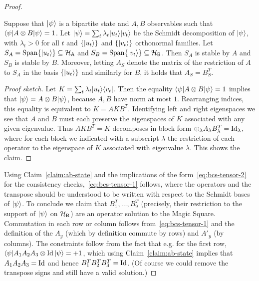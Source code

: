 \begin{proof}
\begin{claim}\label{claim:ab-state}
Suppose that $|\psi\rangle$ is a bipartite state and $A,B$ observables such that $\langle\psi| A\otimes B |\psi\rangle = 1$. Let $|\psi\rangle = \sum_t \lambda_t |u_t\rangle |v_t\rangle$ be the Schmidt decomposition of $|\psi\rangle$, with $\lambda_t>0$ for all $t$ and $\{|u_t\rangle\}$ and $\{|v_t\rangle\}$ orthonormal families. Let  $S_A = \text{Span}\{|u_t\rangle\} \subseteq \mathcal{H}_{\textsf{A}}$ and $S_B=\text{Span}\{|v_t\rangle\} \subseteq \mathcal{H}_{\textsf{B}}$. Then $S_A$ is stable by $A$ and $S_B$ is stable by $B$. Moreover, letting $A_S$ denote the matrix of the restriction of $A$ to $S_A$ in the basis $\{|u_t\rangle\}$ and similarly for $B$, it holds that    $A_S=B_S^T$. 
\end{claim}

\begin{proof}[Proof sketch]
Let $K = \sum_t \lambda_t |u_t\rangle\langle v_t|$. Then the equality $\langle\psi| A\otimes B |\psi\rangle = 1$ implies that $|\psi\rangle = A\otimes B |\psi\rangle$, because $A,B$ have norm at most $1$. Rearranging indices, this equality is equivalent to $K = AKB^T $. Identifying left and right eigenspaces we see that $A$ and $B$ must each preserve the eigenspaces of $K$ associated with any given eigenvalue. Thus $AKB^T = K$ decomposes in block form $\oplus_\lambda  A_\lambda B_\lambda^T = \mathop{\rm Id}\nolimits_\lambda$, where for each block we indicated with a subscript $\lambda$ the restriction of each operator to the eigenspace of $K$ associated with eigenvalue $\lambda$. This shows the claim.  
\end{proof}

Using Claim~\ref{claim:ab-state} and the implications of the form~\eqref{eq:bcs-tensor-2} for the consistency checks,~\eqref{eq:bcs-tensor-1} follows, where the operators and the transpose should be understood to be written with respect to the Schmidt bases of $|\psi\rangle$. To conclude we claim that $B_1^T,\ldots,B_9^T$ (precisely, their restriction to the support of $|\psi\rangle$ on $\mathcal{H}_{\textsf{B}}$) are an operator solution to the Magic Square. Commutation in each row or column follows from~\eqref{eq:bcs-tensor-1} and the definition of the $A_y$ (which by definition commute by rows) and $A'_y$ (by columns). The constraints follow from the fact that e.g. for the first row, $\langle\psi| A_1 A_2 A_3 \otimes \mathop{\rm Id}\nolimits|\psi\rangle = +1$, which using Claim~\ref{claim:ab-state}  implies that $A_1A_2A_3 = \mathop{\rm Id}\nolimits$ and hence $B_1^T B_2^T B_3^T = \mathop{\rm Id}\nolimits$. (Of course we could remove the transpose signs and still have a valid solution.)
\end{proof}



